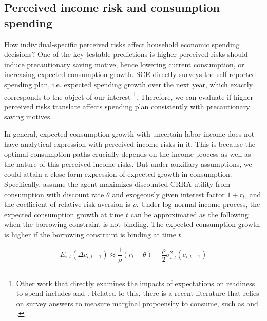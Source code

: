 
    \hypertarget{perceived-income-risk-and-spending}{%
\subsection{Perceived income risk and
consumption spending }\label{perceived-income-risk-and-spending}}

How individual-specific perceived risks affect household
economic spending decisions? One of the key testable predictions is
higher perceived risks should induce precautionary saving motive, hence lowering current consumption, or increasing expected consumption growth. 
SCE directly surveys the self-reported spending plan, i.e. expected spending growth over the next year, which exactly corresponds to the object of our interest
\footnote{Other work that directly examines the impacts of expectations on readiness to spend includes \cite{bachmann2015inflation} and  \cite{coibion2020forward}. Related to this, there is a recent literature that relies on survey answers to measure marginal propoensity to consume, such as \cite{fuster2020would} and \cite{bunn2018consumption}.}. Therefore, we can evaluate if higher perceived risks translate affects spending plan consistently with precautionary saving motives. 

In general, expected consumption growth with uncertain labor income does not have analytical expression with perceived income risks in it. This is because the optimal consumption paths crucially depends on the income process as well as the nature of this perceived income risks. But under auxiliary assumptions, we could attain a close form expression of expected growth in consumption. Specifically, assume the agent maximizes discounted CRRA utility from consumption with discount rate $\theta$ and exogeously given interest factor $1+r_t$, and the coefficient of relative risk aversion is $\rho$. Under log normal income process, the expected consumption growth at time $t$ can be approximated as the following when the borrowing constraint is not binding. The expected consumption growth is higher if the borrowing constraint is binding at time $t$.

\begin{equation}
    E_{i,t}(\Delta c_{i,t+1}) \approx \frac{1}{\rho}(r_t-\theta) + \frac{\rho}{2}\sigma^2_{i,t}(c_{i,t+1})
\end{equation}

